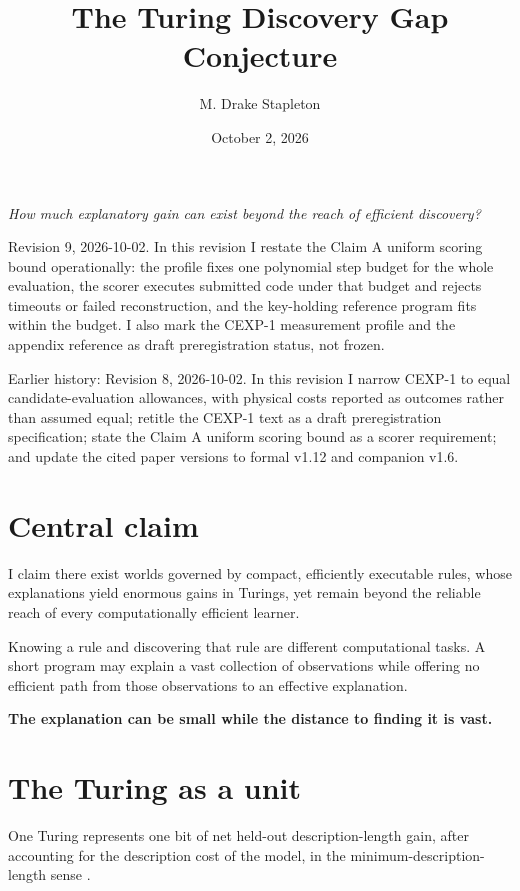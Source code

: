 \documentclass[11pt]{article}
\title{The Turing Discovery Gap Conjecture}
\author{M. Drake Stapleton}
\date{October 2, 2026}
\begin{document}
\maketitle

\begin{center}
\emph{How much explanatory gain can exist beyond the reach of efficient discovery?}
\end{center}

\noindent Revision 9, 2026-10-02. In this revision I restate the Claim A uniform scoring bound operationally: the profile fixes one polynomial step budget for the whole evaluation, the scorer executes submitted code under that budget and rejects timeouts or failed reconstruction, and the key-holding reference program fits within the budget. I also mark the CEXP-1 measurement profile and the appendix reference as draft preregistration status, not frozen.

\noindent Earlier history: Revision 8, 2026-10-02. In this revision I narrow CEXP-1 to equal candidate-evaluation allowances, with physical costs reported as outcomes rather than assumed equal; retitle the CEXP-1 text as a draft preregistration specification; state the Claim A uniform scoring bound as a scorer requirement; and update the cited paper versions to formal v1.12 and companion v1.6.

\section*{Central claim}

I claim there exist worlds governed by compact, efficiently executable rules, whose explanations yield enormous gains in Turings, yet remain beyond the reliable reach of every computationally efficient learner.

Knowing a rule and discovering that rule are different computational tasks. A short program may explain a vast collection of observations while offering no efficient path from those observations to an effective explanation.

\begin{center}
\textbf{The explanation can be small while the distance to finding it is vast.}
\end{center}

\section*{The Turing as a unit}

One Turing represents one bit of net held-out description-length gain, after accounting for the description cost of the model, in the minimum-description-length sense \cite{rissanen1978}.
\end{document}
